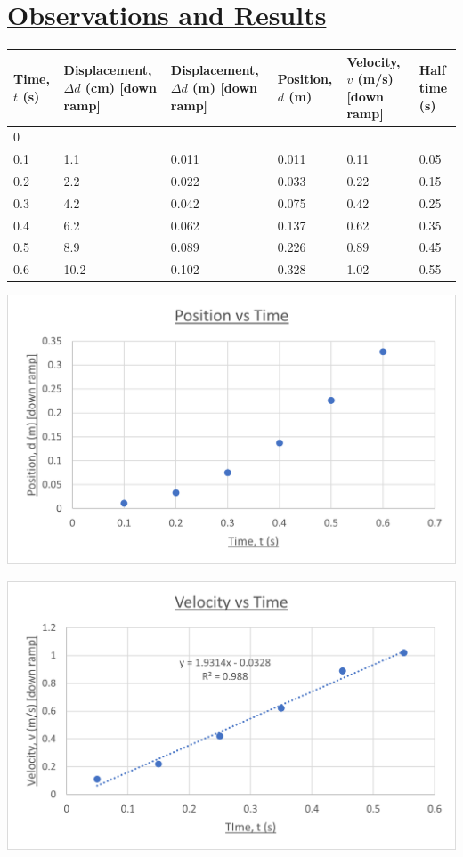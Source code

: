 \documentclass[letterpaper,12pt]{article}
\begin{document}
\section*{\underline{Observations and Results}}
\hspace*{-2.5cm}
\begin{tabular}{|p{2cm}|p{3cm}|p{3cm}|p{3cm}|p{3cm}|p{2cm}|}
    \hline
    Time, $t$ (s) & Displacement, $\Delta d$ (cm) [down ramp] & Displacement, $\Delta d$ (m) [down ramp] & Position, $d$ (m) & Velocity, $v$ (m/s) [down ramp] & Half time (s) \\ \hline
    0 &  &  &  &  &  \\ \hline
    0.1 & 1.1 & 0.011 & 0.011 & 0.11 & 0.05 \\ \hline
    0.2 & 2.2 & 0.022 & 0.033 & 0.22 & 0.15 \\ \hline
    0.3 & 4.2 & 0.042 & 0.075 & 0.42 & 0.25 \\ \hline
    0.4 & 6.2 & 0.062 & 0.137 & 0.62 & 0.35 \\ \hline
    0.5 & 8.9 & 0.089 & 0.226 & 0.89 & 0.45 \\ \hline
    0.6 & 10.2 & 0.102 & 0.328 & 1.02 & 0.55 \\ \hline
\end{tabular}
\includegraphics{pos-time}

\includegraphics{vel-time}
\end{document}
